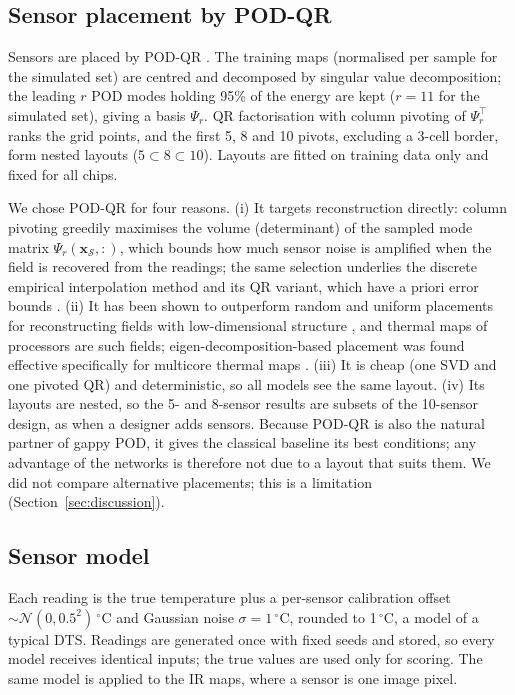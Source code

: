 \documentclass[journal]{IEEEtran}
\begin{document}
\subsection{Sensor placement by POD-QR}
Sensors are placed by POD-QR \cite{manohar2018sensor}.
The training maps (normalised per sample for the simulated set) are centred and decomposed by singular value decomposition; the leading $r$ POD modes holding 95\% of the energy are kept ($r=11$ for the simulated set), giving a basis $\Psi_r$.
QR factorisation with column pivoting of $\Psi_r^\top$ ranks the grid points, and the first 5, 8 and 10 pivots, excluding a 3-cell border, form nested layouts ($5\subset8\subset10$).
Layouts are fitted on training data only and fixed for all chips.

We chose POD-QR for four reasons.
(i) It targets reconstruction directly: column pivoting greedily maximises the volume (determinant) of the sampled mode matrix $\Psi_r(\mathbf{x}_\mathcal{S},:)$, which bounds how much sensor noise is amplified when the field is recovered from the readings; the same selection underlies the discrete empirical interpolation method and its QR variant, which have a priori error bounds \cite{chaturantabut2010deim,drmac2016qdeim}.
(ii) It has been shown to outperform random and uniform placements for reconstructing fields with low-dimensional structure \cite{manohar2018sensor}, and thermal maps of processors are such fields; eigen-decomposition-based placement was found effective specifically for multicore thermal maps \cite{ranieri2012eigenmaps,nowroz2010thermal}.
(iii) It is cheap (one SVD and one pivoted QR) and deterministic, so all models see the same layout.
(iv) Its layouts are nested, so the 5- and 8-sensor results are subsets of the 10-sensor design, as when a designer adds sensors.
Because POD-QR is also the natural partner of gappy POD, it gives the classical baseline its best conditions; any advantage of the networks is therefore not due to a layout that suits them.
We did not compare alternative placements; this is a limitation (Section~\ref{sec:discussion}).

\subsection{Sensor model}
Each reading is the true temperature plus a per-sensor calibration offset $\sim\mathcal N(0,0.5^2)\,^\circ$C and Gaussian noise $\sigma=1\,^\circ$C, rounded to 1\,$^\circ$C, a model of a typical DTS.
Readings are generated once with fixed seeds and stored, so every model receives identical inputs; the true values are used only for scoring.
The same model is applied to the IR maps, where a sensor is one image pixel.
\end{document}
